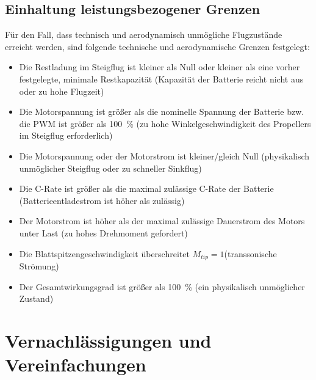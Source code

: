 \subsection{Einhaltung leistungsbezogener Grenzen}
\label{subsec:grenzen}
Für den Fall, dass technisch und aerodynamisch unmögliche Flugzustände erreicht werden, sind folgende technische und aerodynamische Grenzen festgelegt:
\begin{itemize}
	\item Die Restladung im Steigflug ist kleiner als  Null oder kleiner als eine vorher festgelegte, minimale Restkapazität (Kapazität der Batterie reicht nicht aus oder zu hohe Flugzeit)
	\item Die Motorspannung ist größer als die nominelle Spannung der Batterie bzw. die PWM ist größer als \SI{100}{\%} (zu hohe Winkelgeschwindigkeit des Propellers im Steigflug erforderlich)
	\item Die Motorspannung oder der Motorstrom ist kleiner/gleich Null (physikalisch unmöglicher Steigflug oder zu schneller Sinkflug)
	\item Die C-Rate ist größer als die maximal zulässige C-Rate der Batterie (Batterieentladestrom ist höher als zulässig)
	\item Der Motorstrom ist höher als der maximal zulässige Dauerstrom des Motors unter Last (zu hohes Drehmoment gefordert)
	\item Die Blattspitzengeschwindigkeit überschreitet \ensuremath{M_{tip}=1}(transsonische Strömung)
	\item Der Gesamtwirkungsgrad ist größer als \SI{100}{\%} (ein physikalisch unmöglicher Zustand)
\end{itemize}

\section{Vernachlässigungen und Vereinfachungen}
\label{sec:vernachlaessigungen_vereinfachungen}

